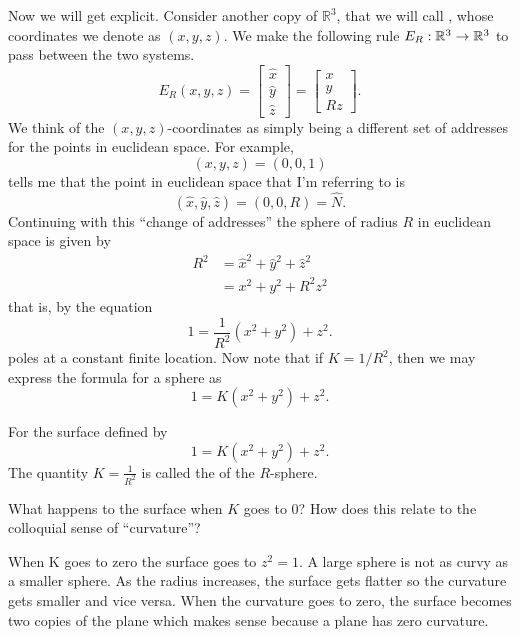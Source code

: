 \documentclass[newpage,hints,handout,12pt,noauthor,nooutcomes]{ximera}
\begin{document}
Now we will get explicit. Consider another copy of $\mathbb{R}^{3}$,
that we will call , whose
coordinates we denote as $( x,y,z) $.  We make the
following rule $E_R:\mathbb R^3\to\mathbb R^3$ to pass between the two systems.
\[
E_R(x,y,z) = 
\begin{bmatrix}
\hat{x}  \\
\hat{y}  \\
\hat{z}  
\end{bmatrix}
=
\begin{bmatrix}
  x\\
  y\\
  Rz
\end{bmatrix}.
\]
We think of the $\left( x,y,z\right) $-coordinates as simply being a
different set of addresses for the points in euclidean space. For
example,
\[
\left(x,y,z\right)  =\left(0,0,1\right)
\]
tells me that the point in euclidean space that I'm referring to is%
\[
\left(\hat{x},\hat{y},\hat{z}\right) =\left( 0,0,R\right)= \hat{N}.
\]
Continuing with this ``change of addresses'' the sphere of radius $R$
in euclidean space is given by
\begin{align*}
  R^{2} &=\hat{x}^{2}+\hat{y}^{2}+\hat{z}^{2}\\
  &=x^{2}+y^{2}+R^{2}z^{2}
\end{align*}
that is, by the equation
\[
1=\frac{1}{R^{2}}\left(  x^{2}+y^{2}\right)  +z^{2}. %
\]
poles at a constant finite location.  Now note that if $K=1/R^2$, then
we may express the formula for a sphere as
\[
1=K(x^{2}+y^{2})+z^{2}.
\]


\begin{definition}
  For the surface defined by
  \[
  1=K\left(  x^{2}+y^{2}\right)  +z^{2}. %
  \]
The quantity $K=\frac{1}{R^{2}}$ is called the  of the
$R$-sphere.
\end{definition}

\begin{problem}
  What happens to the surface when $K$ goes to $0$?  How does this relate to the
  colloquial sense of ``curvature''?
  
\begin{freeResponse}
When K goes to zero the surface goes to $z^{2} =1$.  A large sphere is not as curvy as a smaller sphere. As the radius increases, the surface gets flatter so the curvature gets smaller and vice versa.  When the curvature goes to zero, the surface becomes two copies of the plane which makes sense because a plane has zero curvature.  
\end{freeResponse}

\end{problem}
\end{document}
